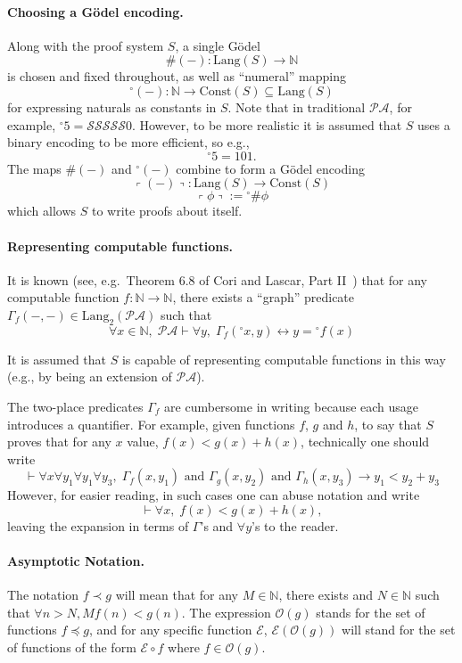\documentclass[onecolumn]{miri-tech-article}
\numberwithin{equation}{section}
\theoremstyle{definition}
\newcommand{\NN}{\mathbb{N}}
\newcommand{\Ee}{\mathcal{E}}
\newcommand{\Oo}{\mathcal{O}}
\newcommand{\Ss}{\mathcal{S}}
\newcommand{\proves}[1]{\underset{#1}{\vdash}}
\newcommand{\PA}{\mathcal{P}\!\mathcal{A}}
\newcommand{\Lang}{\mathrm{Lang}}
\newcommand{\Const}{\mathrm{Const}}
\renewcommand{\implies}{\rightarrow}
\renewcommand{\to}{\rightarrow}
\renewcommand{\iff}{\leftrightarrow}
\newcommand{\qquote}[1]{\left\ulcorner #1 \right\urcorner}
\newcommand{\numeral}{{}^\circ}
\newcommand{\AND}{{\textrm{ and }}}
\renewcommand{\-}{^{-1}}
\begin{document}
\paragraph{Choosing a G\"{o}del encoding.}
Along with the proof system $S$, a single G\"{o}del
 $$\#(-) : \Lang(S) \to \NN$$
is chosen and fixed throughout, as well as ``numeral'' mapping
$$\numeral(-) : \NN \to \Const(S)\subseteq \Lang(S)$$
for expressing naturals as constants in $S$.  Note that in traditional $\PA$, for example, $\numeral 5 = \Ss\Ss\Ss\Ss\Ss0$.  However, to be more realistic it is assumed that $S$ uses a binary encoding to be more efficient, so e.g.,
$$\numeral 5 = 101.$$
The maps $\#(-)$ and $\numeral(-)$ combine to form a G\"{o}del encoding
$$\qquote{(-)} : \Lang(S)\to\Const(S)$$
$$\qquote{\phi}:=\numeral \# \phi$$
which allows $S$ to write proofs about itself.

\paragraph{Representing computable functions.}\label{sec:rep}
It is known (see, e.g.\ Theorem 6.8 of Cori and Lascar, Part II~\cite{Cori:2001}) that for any computable function $f:\NN\to\NN$, there exists a ``graph'' predicate $\Gamma_f(-,-)\in\Lang_2(\PA)$ such that
%
$$\forall x\in\NN, \; \PA \proves{} \forall y, \; \Gamma_f(\numeral x,y) \iff y = \numeral f(x)$$

\noindent It is assumed that $S$ is capable of representing computable functions in this way (e.g., by being an extension of $\PA$).

The two-place predicates $\Gamma_f$ are cumbersome in writing because each usage introduces a quantifier.  For example, given functions $f$, $g$ and $h$, to say that $S$ proves that for any $x$ value, $f(x) < g(x) + h(x)$, technically one should write
%
$$\proves{} \forall x \forall y_1 \forall y_1 \forall y_3,\; \Gamma_f(x,y_1) \AND \Gamma_g(x,y_2)\AND \Gamma_h(x,y_3) \implies y_1 < y_2 + y_3$$
%
However, for easier reading, in such cases one can abuse notation and write
$$\proves{} \forall x, \; f(x) < g(x) + h(x),$$
leaving the expansion in terms of $\Gamma$'s and $\forall y$'s to the reader.

\paragraph{Asymptotic Notation.}
The notation $f \prec g$ will mean that for any $M\in \NN$, there exists and $N\in\NN$ such that $\forall n>N, Mf(n) < g(n)$.  The expression $\Oo(g)$ stands for the set of functions $f\preceq g$, and for any specific function $\Ee$, $\Ee(\Oo(g))$ will stand for the set of functions of the form $\Ee \circ f$ where $f\in \Oo(g)$.
\end{document}
